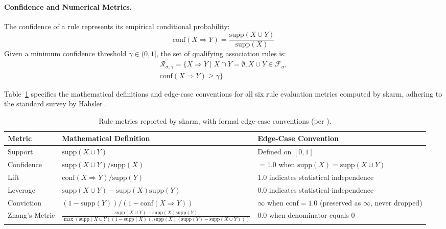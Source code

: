 \documentclass[twocolumn,10pt]{article}
\newcommand{\skarm}{\textsf{skarm}\xspace}
\begin{document}
\paragraph{Confidence and Numerical Metrics.} The confidence of a rule represents its empirical conditional probability:
\begin{equation}
\mathrm{conf}(X \Rightarrow Y) = \frac{\mathrm{supp}(X \cup Y)}{\mathrm{supp}(X)}
\end{equation}
Given a minimum confidence threshold $\gamma \in (0, 1]$, the set of qualifying association rules is:
\begin{equation}
\begin{split}
\mathcal{R}_{\sigma, \gamma} = \{X \Rightarrow Y \mid X \cap Y = \emptyset, X \cup Y \in \mathcal{F}_\sigma, \\
\mathrm{conf}(X \Rightarrow Y) \ge \gamma\}
\end{split}
\end{equation}

Table~\ref{tab:metrics} specifies the mathematical definitions and edge-case conventions for all six rule evaluation metrics computed by \skarm, adhering to the standard survey by Hahsler \cite{hahsler}.

\begin{table}[t]
\centering
\caption{Rule metrics reported by \skarm, with formal edge-case conventions (per \cite{hahsler}).}
\label{tab:metrics}
\setlength{\tabcolsep}{4pt}
\begin{tabular}{p{2.2cm}p{8.2cm}p{4.7cm}}
\toprule
\textbf{Metric} & \textbf{Mathematical Definition} & \textbf{Edge-Case Convention} \\
\midrule
Support & $\mathrm{supp}(X \cup Y)$ & Defined on $[0, 1]$ \\
Confidence & $\mathrm{supp}(X \cup Y) / \mathrm{supp}(X)$ & $=1.0$ when $\mathrm{supp}(X) = \mathrm{supp}(X \cup Y)$ \\
Lift & $\mathrm{conf}(X \Rightarrow Y) / \mathrm{supp}(Y)$ & $1.0$ indicates statistical independence \\
Leverage & $\mathrm{supp}(X \cup Y) - \mathrm{supp}(X)\mathrm{supp}(Y)$ & $0.0$ indicates statistical independence \\
Conviction & $(1 - \mathrm{supp}(Y)) / (1 - \mathrm{conf}(X \Rightarrow Y))$ & $\infty$ when $\mathrm{conf} = 1.0$ (preserved as $\infty$, never dropped) \\
Zhang's Metric & $\frac{\mathrm{supp}(X \cup Y) - \mathrm{supp}(X)\mathrm{supp}(Y)}{\max(\mathrm{supp}(X \cup Y)(1-\mathrm{supp}(X)), \mathrm{supp}(X)(\mathrm{supp}(Y)-\mathrm{supp}(X \cup Y)))}$ & $0.0$ when denominator equals $0$ \\
\bottomrule
\end{tabular}
\end{table}
\end{document}
